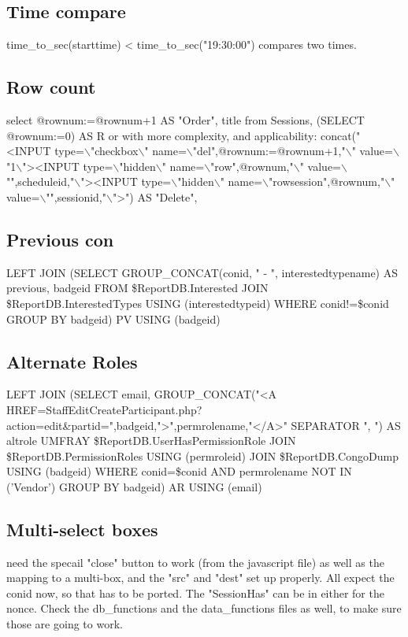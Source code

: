 \documentclass[captions=tablesignature]{scrartcl}
\begin{document}
\subsection{Time compare}
\label{sec-2-3}
time\_to\_sec(starttime) < time\_to\_sec("19:30:00") compares two times.

\subsection{Row count}
\label{sec-2-4}
select @rownum:=@rownum+1 AS "Order", title from Sessions, (SELECT @rownum:=0) AS R
or with more complexity, and applicability:
concat("<INPUT type=$\backslash$"checkbox$\backslash$" name=$\backslash$"del",@rownum:=@rownum+1,"$\backslash$" value=$\backslash$"1$\backslash$">\n<INPUT type=$\backslash$"hidden$\backslash$" name=$\backslash$"row",@rownum,"$\backslash$" value=$\backslash$"",scheduleid,"$\backslash$"><INPUT type=$\backslash$"hidden$\backslash$" name=$\backslash$"rowsession",@rownum,"$\backslash$" value=$\backslash$"",sessionid,"$\backslash$">") AS "Delete",

\subsection{Previous con}
\label{sec-2-5}
LEFT JOIN (SELECT
               GROUP\_CONCAT(conid, " - ", interestedtypename) AS previous,
               badgeid
             FROM
                 \$ReportDB.Interested
               JOIN \$ReportDB.InterestedTypes USING (interestedtypeid)
             WHERE
                conid!=\$conid
              GROUP BY
                 badgeid) PV USING (badgeid)

\subsection{Alternate Roles}
\label{sec-2-6}
LEFT JOIN (SELECT
               email,
               GROUP\_CONCAT("<A HREF=StaffEditCreateParticipant.php?action=edit\&partid=",badgeid,">",permrolename,"</A>" SEPARATOR ", ") AS altrole
             UMFRAY
                 \$ReportDB.UserHasPermissionRole
               JOIN \$ReportDB.PermissionRoles USING (permroleid)
               JOIN \$ReportDB.CongoDump USING (badgeid)
             WHERE
               conid=\$conid AND
               permrolename NOT IN ('Vendor')
             GROUP BY
               badgeid) AR USING (email)

\subsection{Multi-select boxes}
\label{sec-2-7}
need the specail "close" button to work (from the javascript file)
as well as the mapping to a multi-box, and the "src" and "dest" set
up properly.  All expect the conid now, so that has to be ported.
The "SessionHas" can be in either for the nonce.  Check the
db\_functions and the data\_functions files as well, to make sure
those are going to work.
\end{document}
